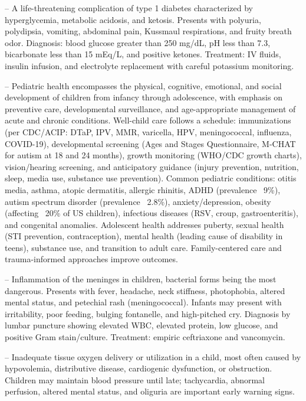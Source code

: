 -- A life-threatening complication of type 1 diabetes characterized by hyperglycemia, metabolic acidosis, and ketosis. Presents with polyuria, polydipsia, vomiting, abdominal pain, Kussmaul respirations, and fruity breath odor. Diagnosis: blood glucose greater than 250 mg/dL, pH less than 7.3, bicarbonate less than 15 mEq/L, and positive ketones. Treatment: IV fluids, insulin infusion, and electrolyte replacement with careful potassium monitoring.

-- Pediatric health encompasses the physical, cognitive, emotional, and social development of children from infancy through adolescence, with emphasis on preventive care, developmental surveillance, and age-appropriate management of acute and chronic conditions. Well-child care follows a schedule: immunizations (per CDC/ACIP: DTaP, IPV, MMR, varicella, HPV, meningococcal, influenza, COVID-19), developmental screening (Ages and Stages Questionnaire, M-CHAT for autism at 18 and 24 months), growth monitoring (WHO/CDC growth charts), vision/hearing screening, and anticipatory guidance (injury prevention, nutrition, sleep, media use, substance use prevention). Common pediatric conditions: otitis media, asthma, atopic dermatitis, allergic rhinitis, ADHD (prevalence ~9\%), autism spectrum disorder (prevalence ~2.8\%), anxiety/depression, obesity (affecting ~20\% of US children), infectious diseases (RSV, croup, gastroenteritis), and congenital anomalies. Adolescent health addresses puberty, sexual health (STI prevention, contraception), mental health (leading cause of disability in teens), substance use, and transition to adult care. Family-centered care and trauma-informed approaches improve outcomes.

-- Inflammation of the meninges in children, bacterial forms being the most dangerous. Presents with fever, headache, neck stiffness, photophobia, altered mental status, and petechial rash (meningococcal). Infants may present with irritability, poor feeding, bulging fontanelle, and high-pitched cry. Diagnosis by lumbar puncture showing elevated WBC, elevated protein, low glucose, and positive Gram stain/culture. Treatment: empiric ceftriaxone and vancomycin.

-- Inadequate tissue oxygen delivery or utilization in a child, most often caused by hypovolemia, distributive disease, cardiogenic dysfunction, or obstruction. Children may maintain blood pressure until late; tachycardia, abnormal perfusion, altered mental status, and oliguria are important early warning signs.

